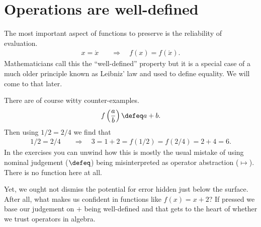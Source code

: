 
\section{Operations are well-defined}
The most important aspect of functions to preserve is the reliability of evaluation.
\begin{align*}
    \tag{Well-defined}
    x=\acute{x} & \quad\Rightarrow\quad f(x)=f(\acute{x}).
\end{align*}
Mathematicians call this the ``well-defined'' property but it 
is a special case of a much older principle known as Leibniz' law 
and used to define equality.  We will come to that later.

There are of course witty counter-examples.
\begin{align*}
    f\left(\frac{a}{b}\right)\defeq a+b.
\end{align*}
Then using $1/2=2/4$ we find that
\begin{align*}
    1/2 = 2/4 & \quad \Rightarrow\quad 3=1+2=f(1/2)=f(2/4)=2+4=6.
\end{align*}
In the exercises you can unwind how this is mostly the 
usual mistake of using nominal judgement ($\defeq$) 
being misinterpreted as operator abstraction ($\mapsto$).
There is no function here at all.

Yet, we ought not dismiss the potential for error hidden 
just below the surface.  After all, what makes us 
confident in functions like $f(x)=x+2$?  If pressed we 
base our judgement on $+$ being well-defined and that 
gets to the heart of whether we trust operators in algebra.



